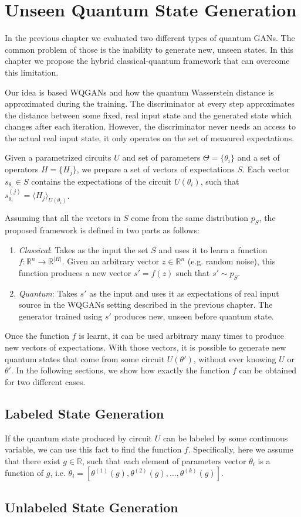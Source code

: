 \chapter{Unseen Quantum State Generation}\label{chapter:my_contribution}
In the previous chapter we evaluated two different types of quantum GANs. The
common problem of those is the inability to generate new, unseen states. In this
chapter we propose the hybrid classical-quantum framework that can overcome this limitation. 

Our idea is based WQGANs and how the quantum Wasserstein distance is
approximated during the training. The discriminator at every step approximates
the distance between some fixed, real input state and the generated state which
changes after each iteration. However, the discriminator never needs an access to
the actual real input state, it only operates on the set of measured
expectations.

Given a parametrized circuits $U$
and set of parameters $\Theta = \{\theta_i\}$ and a set of operators $H =
\{H_j\}$, we prepare a set of vectors of expectations $S$. Each vector $s_{\theta_i}
\in S$ contains the expectations of the circuit $U(\theta_i)$, such that
$s_{\theta_i}^{(j)} = \langle H_j \rangle_{U(\theta_i)} $.

Assuming that all the vectors in $S$ come from the same distribution $p_S$,
the proposed framework is defined in two parts as follows:
\begin{enumerate}
\item \textit{Classical}: Takes as the input the set $S$ and uses it to learn a function $f:
  \mathbb{R}^{n} \to \mathbb{R}^{|H|}$. Given an arbitrary vector $z \in
  \mathbb{R}^n$ (e.g. random noise), this function produces a new vector $s' =
  f(z)$ such that $s' \sim p_S$.  
\item \textit{Quantum}: Takes $s'$ as the input and uses it as
  expectations of real input source in the WQGANs setting described in the
  previous chapter. The generator trained using $s'$ produces new, unseen before
  quantum state.
\end{enumerate}

Once the function $f$ is learnt, it can be used arbitrary many times to produce
new vectors of expectations.
With those vectors, it is possible to generate new quantum states that come from
some circuit $U(\theta')$, without ever knowing $U$ or $\theta'$.
In the following sections, we show how exactly the function $f$ can be obtained
for two different cases. 
\section{Labeled State Generation}
If the quantum state produced by circuit $U$ can be labeled by some continuous
variable, we can use this fact to find the function $f$. Specifically, here we
assume that there exist $g \in \mathbb{R}$, such that each element of parameters
vector $\theta_i$ is a function of $g$, i.e. $\theta_i = [\theta^{(1)}(g),
\theta^{(2)}(g), \ldots, \theta^{(k)}(g)]$. 

\section{Unlabeled State Generation}

